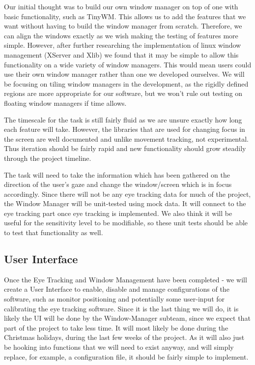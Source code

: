 \documentclass{article}
\begin{document}
Our initial thought was to build our own window manager on top of one with basic functionality, such as TinyWM.  This allows us to add the features that we want without having to build the window manager from scratch.  Therefore, we can align the windows exactly as we wish making the testing of features more simple.  However, after further researching the implementation of linux window management (XServer and Xlib) we found that it may be simple to allow this functionality on a wide variety of window managers.  This would mean users could use their own window manager rather than one we developed ourselves. We will be focusing on tiling window managers in the development, as the rigidly defined regions are more appropriate for our software, but we won’t rule out testing on floating window managers if time allows.

The timescale for the task is still fairly fluid as we are unsure exactly how long each feature will take. However, the libraries that are used for changing focus in the screen are well documented and unlike movement tracking, not experimental. Thus iteration should be fairly rapid and new functionality should grow steadily through the project timeline.

The task will need to take the information which has been gathered on the direction of the user’s gaze and change the window/screen which is in focus accordingly. Since there will not be any eye tracking data for much of the project, the Window Manager will be unit-tested using mock data. It will connect to the eye tracking part once eye tracking is implemented. We also think it will be useful for the sensitivity level to be modifiable, so these unit tests should be able to test that functionality as well.

\subsection*{User Interface}
Once the Eye Tracking and Window Management have been completed - we will create a User Interface to enable, disable and manage configurations of the software, such as monitor positioning and potentially some user-input for calibrating the eye tracking software. Since it is the last thing we will do, it is likely the UI will be done by the Window-Manager subteam, since we expect that part of the project to take less time. It will most likely be done during the Christmas holidays, during the last few weeks of the project. As it will also just be hooking into functions that we will need to exist anyway, and will simply replace, for example, a configuration file, it should be fairly simple to implement.
\end{document}
